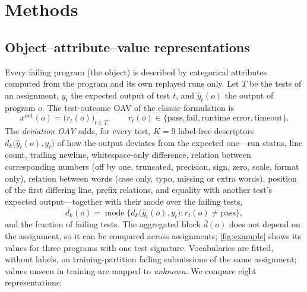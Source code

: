 \documentclass[a4paper,preprint,12pt,authoryear]{elsarticle}
\begin{document}
\section{Methods}\label{sec:methods}

\subsection{Object--attribute--value representations}\label{sec:reps}
Every failing program (the object) is described by categorical attributes computed from the program and its own replayed runs only. Let $T$ be the tests of an assignment, $y_t$ the expected output of test $t$, and $\hat y_t(o)$ the output of program $o$. The test-outcome OAV of the classic formulation is
\begin{equation}
x^{\mathrm{out}}(o) = \bigl(r_t(o)\bigr)_{t \in T}, \qquad r_t(o) \in \{\text{pass}, \text{fail}, \text{runtime error}, \text{timeout}\}.
\end{equation}
The \emph{deviation OAV} adds, for every test, $K = 9$ label-free descriptors $d_k\bigl(\hat y_t(o), y_t\bigr)$ of how the output deviates from the expected one---run status, line count, trailing newline, whitespace-only difference, relation between corresponding numbers (off by one, truncated, precision, sign, zero, scale, format only), relation between words (case only, typo, missing or extra words), position of the first differing line, prefix relations, and equality with another test's expected output---together with their mode over the failing tests,
\begin{equation}
\bar d_k(o) = \operatorname{mode}\bigl\{ d_k\bigl(\hat y_t(o), y_t\bigr) : r_t(o) \neq \text{pass} \bigr\},
\end{equation}
and the fraction of failing tests. The aggregated block $\bar d(o)$ does not depend on the assignment, so it can be compared across assignments; \cref{fig:example} shows its values for three programs with one test signature. Vocabularies are fitted, without labels, on training-partition failing submissions of the same assignment; values unseen in training are mapped to \emph{unknown}. We compare eight representations:
\end{document}
